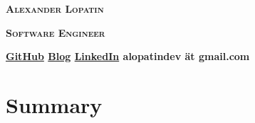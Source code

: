 \begin{center}
\fontsize{20pt}{15pt}\selectfont
\textsc{\lsstyle\bfseries Alexander Lopatin\mdseries}

\vspace{8pt}

\fontsize{14pt}{10pt}\selectfont
\textsc{\bfseries Software Engineer\mdseries}

\vspace{6pt}


\horizline

\vspace{0.4cm}

{
\bfseries
\fontsize{9pt}{9pt}\selectfont
\faGithub\hspace{0.1cm}\href{https://github.com/alopatindev}{GitHub}
\contactDelimiter\faRss\hspace{0.1cm}\href{https://alopatindev.github.io}{Blog}
\contactDelimiter\faLinkedinSquare\hspace{0.1cm}\href{https://www.linkedin.com/in/AlexanderLopatin}{LinkedIn}
\contactDelimiter\faEnvelope\hspace{0.1cm}alopatindev ät gmail.com
\mdseries
}

\end{center}

\fontsize{11pt}{12pt}\selectfont

\section*{Summary}


